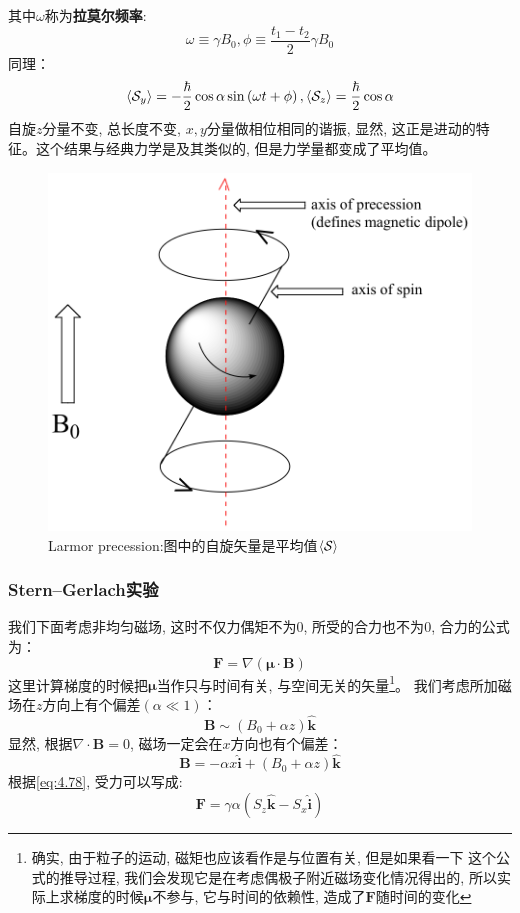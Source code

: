 \documentclass[a4paper,zihao=-4,linespread=1]{ctexrep}
\begin{document}
    其中$\omega$称为\textbf{拉莫尔频率}:
    \[\omega\equiv\gamma B_0,\phi\equiv \frac{t_1-t_2}{2}\gamma B_0\]
    同理：
    \begin{equation}
        \braket{\mathcal{S}_y}=-\frac{\hbar}{2}\cos\alpha\sin\left(\omega t+\phi\right)
        , \braket{\mathcal{S}_z}=\frac{\hbar}{2}\cos\alpha
    \end{equation}
    自旋$z$分量不变, 总长度不变, $x,y$分量做相位相同的谐振, 显然, 这正是进动的特征。这个结果与经典力学是及其类似的, 但是力学量都变成了平均值。
    \begin{figure}[htbp]
        \centering
        \includegraphics[]{fig/4-1.png}
        \caption{Larmor precession:图中的自旋矢量是平均值$\braket{\mathcal{S}}$}
    \end{figure}

    \subsubsection*{Stern–Gerlach实验}
    我们下面考虑非均匀磁场, 这时不仅力偶矩不为$0$, 所受的合力也不为$0$, 合力的公式为：
    \begin{equation}
        \label{eq:4.78}
        \mathbf{F}=\nabla\left(\mathbf{\mu}\cdot\mathbf{B}\right)
    \end{equation}
    这里计算梯度的时候把$\mathbf{\mu}$当作只与时间有关, 与空间无关的矢量\footnote{确实, 由于粒子的运动, 磁矩也应该看作是与位置有关, 但是如果看一下
    这个公式的推导过程, 我们会发现它是在考虑偶极子附近磁场变化情况得出的, 所以实际上求梯度的时候$\mathbf{\mu}$不参与, 它与时间的依赖性, 造成了$\mathbf{F}$随时间的变化}。
    我们考虑所加磁场在$z$方向上有个偏差$(\alpha\ll 1)$：
    \[\mathbf{B}\sim\left(B_0+\alpha z\right)\hat{\mathbf{k}}\]
    显然, 根据$\nabla\cdot\mathbf{B}=0$, 磁场一定会在$x$方向也有个偏差：
    \[\mathbf{B}=-\alpha x \hat{\mathbf{i}}+\left(B_0+\alpha z\right)\hat{\mathbf{k}}\]
    根据\ref{eq:4.78}, 受力可以写成:
    \begin{equation}
        \mathbf{F}=\gamma\alpha\left(S_z\hat{\mathbf{k}}-S_x\hat{\mathbf{i}}\right)
    \end{equation}
    
\end{document}
